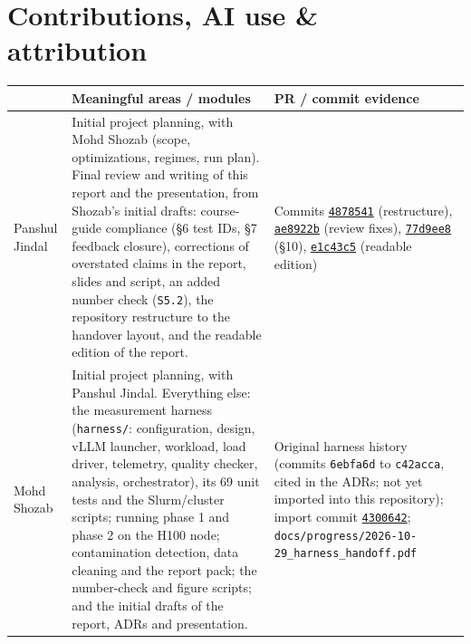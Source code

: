 \documentclass[10pt,a4paper]{article}
\newcommand{\hc}[1]{{\leavevmode\bfseries\color{ink}#1}}   %
\newcommand{\fp}[1]{{\leavevmode\urlstyle{tt}\color{codecol}\nolinkurl{#1}}}
\begin{document}
\section{Contributions, AI use \& attribution}
\begin{table}[H]
\small
{
\begin{tabularx}{\linewidth}{@{}P{2.6cm}LP{4.6cm}@{}}
\toprule
\rowcolor{tblhead}\hc{Member} & \hc{Meaningful areas / modules} & \hc{PR / commit evidence} \\
\midrule
Panshul Jindal & Initial project planning, with Mohd Shozab (scope, optimizations, regimes, run plan). Final
review and writing of this report and the presentation, from Shozab's initial drafts: course-guide compliance
(\S6 test IDs, \S7 feedback closure), corrections of overstated claims in the report, slides and script, an added
number check (\texttt{S5.2}), the repository restructure to the handover layout, and the readable edition
of the report. & Commits
\href{https://github.com/Panshul-Jindal/SpeedingUpLLMInference/commit/4878541503bf0dc5d6a3b0e941c37efaa63cb6ce}{\texttt{4878541}} (restructure),
\href{https://github.com/Panshul-Jindal/SpeedingUpLLMInference/commit/ae8922bbbcfabfbe7f4fbdc927f4e35ada2d742a}{\texttt{ae8922b}} (review fixes),
\href{https://github.com/Panshul-Jindal/SpeedingUpLLMInference/commit/77d9ee8}{\texttt{77d9ee8}} (\S10),
\href{https://github.com/Panshul-Jindal/SpeedingUpLLMInference/commit/e1c43c5}{\texttt{e1c43c5}} (readable edition) \\
Mohd Shozab & Initial project planning, with Panshul Jindal. Everything else: the measurement harness
(\fp{harness/}: configuration, design, vLLM launcher, workload, load driver, telemetry, quality checker, analysis,
orchestrator), its 69 unit tests and the Slurm/cluster scripts; running phase 1 and phase 2 on the H100 node;
contamination detection, data cleaning and the report pack; the number-check and figure scripts; and the initial
drafts of the report, ADRs and presentation. & Original harness history (commits \texttt{6ebfa6d} to
\texttt{c42acca}, cited in the ADRs; not yet imported into this repository); import commit
\href{https://github.com/Panshul-Jindal/SpeedingUpLLMInference/commit/4300642b7d3810d7eac72616de71af8cc8a158a4}{\texttt{4300642}};
\fp{docs/progress/2026-10-29_harness_handoff.pdf} \\
\bottomrule
\end{tabularx}}
\end{table}
\end{document}

